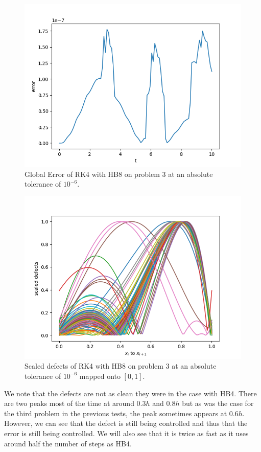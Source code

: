 \begin{figure}[H]
\centering
\includegraphics[width=0.7\linewidth]{./figures/rk4_with_hb8_p3_global_error}
\caption{Global Error of RK4 with HB8 on problem 3 at an absolute tolerance of $10^{-6}$.}
\label{fig:rk4_with_hb8_p3_global_error}
\end{figure}

\begin{figure}[H]
\centering
\includegraphics[width=0.7\linewidth]{./figures/rk4_with_hb8_p3_scaled_defects}
\caption{Scaled defects of RK4 with HB8 on problem 3 at an absolute tolerance of $10^{-6}$ mapped onto $[0, 1]$.}
\label{fig:rk4_with_hb8_p3_scaled_defects}
\end{figure}

We note that the defects are not as clean they were in the case with HB4. There are two peaks most of the time at around $0.3h$ and $0.8h$ but as was the case for the third problem in the previous tests, the peak sometimes appears at $0.6h$. However, we can see that the defect is still being controlled and thus that the error is still being controlled. We will also see that it is twice as fast as it uses around half the number of steps as HB4.

